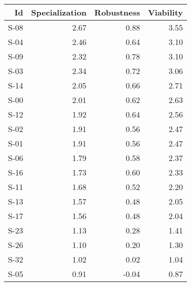 \begin{tabular}{ | r | r | r | r | }
    \hline
                    Id  &  Specialization  &      Robustness  &       Viability  \\
    \hline
    \hline
                  S-08  &            2.67  &            0.88  &            3.55  \\
    \hline
                  S-04  &            2.46  &            0.64  &            3.10  \\
    \hline
                  S-09  &            2.32  &            0.78  &            3.10  \\
    \hline
                  S-03  &            2.34  &            0.72  &            3.06  \\
    \hline
                  S-14  &            2.05  &            0.66  &            2.71  \\
    \hline
                  S-00  &            2.01  &            0.62  &            2.63  \\
    \hline
                  S-12  &            1.92  &            0.64  &            2.56  \\
    \hline
                  S-02  &            1.91  &            0.56  &            2.47  \\
    \hline
                  S-01  &            1.91  &            0.56  &            2.47  \\
    \hline
                  S-06  &            1.79  &            0.58  &            2.37  \\
    \hline
                  S-16  &            1.73  &            0.60  &            2.33  \\
    \hline
                  S-11  &            1.68  &            0.52  &            2.20  \\
    \hline
                  S-13  &            1.57  &            0.48  &            2.05  \\
    \hline
                  S-17  &            1.56  &            0.48  &            2.04  \\
    \hline
                  S-23  &            1.13  &            0.28  &            1.41  \\
    \hline
                  S-26  &            1.10  &            0.20  &            1.30  \\
    \hline
                  S-32  &            1.02  &            0.02  &            1.04  \\
    \hline
                  S-05  &            0.91  &           -0.04  &            0.87  \\

\end{tabular}
